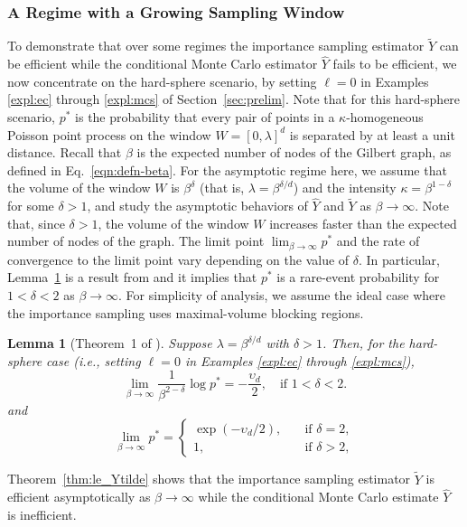 \documentclass[pdflatex, sn-mathphys-ay]{sn-jnl}%
\newcommand{\wt}{\widetilde}
\newcommand{\wh}{\widehat}
\newtheorem{lemma}{Lemma}
\theoremstyle{thmstyleone}%
\theoremstyle{thmstyletwo}%
\theoremstyle{thmstylethree}%
\begin{document}
\subsubsection{A Regime with a Growing Sampling Window}
To demonstrate that over some regimes the importance sampling estimator $\widetilde{Y}$ can be efficient while the conditional Monte Carlo estimator $\widehat{Y}$ fails to be efficient, we now concentrate on the hard-sphere scenario, by setting $\ell = 0$ in Examples \ref{expl:ec} through \ref{expl:mcs} of Section~\ref{sec:prelim}. Note that for this hard-sphere scenario, $p^*$ is the probability that every pair of points in a $\kappa$-homogeneous Poisson point process on the window $W = [0, \lambda]^d$ is separated by at least a unit distance. Recall that $\beta$ is the expected number of nodes of the Gilbert graph, as defined in Eq.~\eqref{eqn:defn-beta}. For the asymptotic regime here, we assume that the volume of the window $W$ is $\beta^\delta$ (that is, $\lambda = \beta^{\delta/d}$) and the intensity $\kappa = \beta^{1 - \delta}$ for some $\delta > 1$, and study the asymptotic behaviors of $\wh Y$ and $\wt Y$ as $\beta \to \infty$. 
Note that, since $\delta > 1$, the volume of the window $W$ increases faster than the expected number of nodes of the graph. 
The limit point $\lim_{\beta \to \infty} p^*$ and the rate of convergence to the limit point vary depending on the value of $\delta$. In particular, Lemma~\ref{lem:lim-pstar} is a result from \cite{MJM17} and it implies that $p^*$ is a rare-event probability for $1 < \delta < 2$ as $\beta \to \infty$. For simplicity of analysis, we assume the ideal case where the importance sampling uses maximal-volume blocking regions.  
\begin{lemma}[Theorem~1 of \cite{MJM17}]
    \label{lem:lim-pstar}
    Suppose $\lambda = \beta^{\delta/d}$ with $\delta > 1$. Then, {  for the hard-sphere case (i.e., setting $\ell = 0$ in Examples \ref{expl:ec} through \ref{expl:mcs}),} 
    \[
    \lim_{\beta \to \infty}\frac{1}{\beta^{2 - \delta}}\log p^* = 
    - \frac{\upsilon_d}{2}, \quad \text{if} \,\, 1 < \delta < 2.
    \]
    and
    \[
    \lim_{\beta \to \infty} p^* = 
    \begin{cases}
        \exp(-\upsilon_d/2), &\quad \text{if} \,\, \delta = 2,\\
        1, &\quad \text{if} \,\, \delta > 2,
    \end{cases}
    \]
\end{lemma}
Theorem~\ref{thm:le_Ytilde} shows that the importance sampling estimator $\wt Y$ is efficient asymptotically as $\beta \to \infty$ while the conditional Monte Carlo estimate $\wh Y$ is inefficient.
\end{document}
